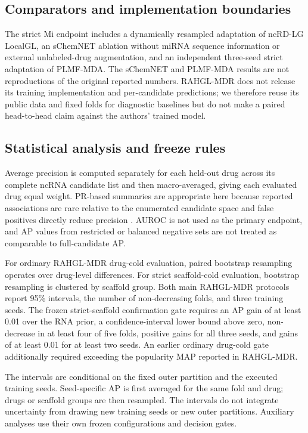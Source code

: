 \documentclass[10pt]{article}
\begin{document}
\subsection{Comparators and implementation boundaries}

The strict Mi endpoint includes a dynamically resampled adaptation of ncRD-LG LocalGL, an sChemNET ablation without miRNA sequence information or external unlabeled-drug augmentation, and an independent three-seed strict adaptation of PLMF-MDA. The sChemNET and PLMF-MDA results are not reproductions of the original reported numbers. RAHGL-MDR does not release its training implementation and per-candidate predictions; we therefore reuse its public data and fixed folds for diagnostic baselines but do not make a paired head-to-head claim against the authors' trained model.

\subsection{Statistical analysis and freeze rules}

Average precision is computed separately for each held-out drug across its complete ncRNA candidate list and then macro-averaged, giving each evaluated drug equal weight. PR-based summaries are appropriate here because reported associations are rare relative to the enumerated candidate space and false positives directly reduce precision \citep{davis2006prroc,saito2015pr}. AUROC is not used as the primary endpoint, and AP values from restricted or balanced negative sets are not treated as comparable to full-candidate AP.

For ordinary RAHGL-MDR drug-cold evaluation, paired bootstrap resampling operates over drug-level differences. For strict scaffold-cold evaluation, bootstrap resampling is clustered by scaffold group. Both main RAHGL-MDR protocols report 95\% intervals, the number of non-decreasing folds, and three training seeds. The frozen strict-scaffold confirmation gate requires an AP gain of at least 0.01 over the RNA prior, a confidence-interval lower bound above zero, non-decrease in at least four of five folds, positive gains for all three seeds, and gains of at least 0.01 for at least two seeds. An earlier ordinary drug-cold gate additionally required exceeding the popularity MAP reported in RAHGL-MDR.

The intervals are conditional on the fixed outer partition and the executed training seeds. Seed-specific AP is first averaged for the same fold and drug; drugs or scaffold groups are then resampled. The intervals do not integrate uncertainty from drawing new training seeds or new outer partitions. Auxiliary analyses use their own frozen configurations and decision gates.
\end{document}

